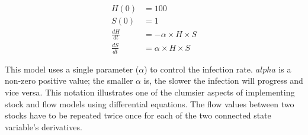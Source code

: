 \documentclass[]{memoir}
\begin{document}
\[
\begin{aligned}
H(0) &= 100 \\
S(0) &= 1 \\
\frac{dH}{dt} &= - \alpha \times H \times S \\ 
\frac{dS}{dt} &= \alpha \times H \times S
\end{aligned}
\]

This model uses a single parameter ($\alpha$) to control the infection
rate. $alpha$ is a non-zero positive value; the smaller $\alpha$ is, the
slower the infection will progress and vice versa. This notation
illustrates one of the clumsier aspects of implementing stock and flow
models using differential equations. The flow values between two stocks
have to be repeated twice once for each of the two connected state
variable's derivatives.

\FloatBarrier 
\end{document}
